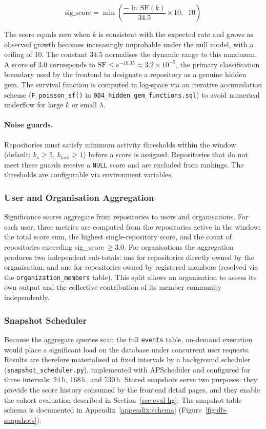 \documentclass[sigconf]{acmart}
\begin{document}
$$\text{sig\_score} = \min\!\left(\frac{-\ln\,\mathrm{SF}(k)}{34.5} \times 10,\;\; 10\right)$$

The score equals zero when $k$ is consistent with the expected rate and grows as
observed growth becomes increasingly improbable under the null model, with a
ceiling of 10. The constant $34.5$ normalises the dynamic range to this maximum.
A score of $3.0$ corresponds to
$\mathrm{SF} \leq e^{-10.35} \approx 3.2 \times 10^{-5}$, the primary
classification boundary used by the frontend to designate a repository as a
genuine hidden gem. The survival function is computed in log-space via an
iterative accumulation scheme (\texttt{F\_poisson\_sf()} in
\texttt{004\_hidden\_gem\_functions.sql}) to avoid numerical underflow for large
$k$ or small $\lambda$.

\paragraph{Noise guards.}
Repositories must satisfy minimum activity thresholds within the window (default:
$k_{\star} \geq 5$, $k_{\mathrm{fork}} \geq 1$) before a score is assigned. Repositories
that do not meet these guards receive a \texttt{NULL} score and are excluded from
rankings. The thresholds are configurable via environment variables.

\subsubsection{User and Organisation Aggregation}

Significance scores aggregate from repositories to users and organisations.
For each user, three metrics are computed from the repositories active in the
window: the total score sum, the highest single-repository score, and the count
of repositories exceeding sig\_score\,$\geq 3.0$. For organisations the
aggregation produces two independent sub-totals: one for repositories directly
owned by the organisation, and one for repositories owned by registered members
(resolved via the \texttt{organization\_members} table). This split allows an
organisation to assess its own output and the collective contribution of its
member community independently.

\subsubsection{Snapshot Scheduler}

Because the aggregate queries scan the full \texttt{events} table, on-demand
execution would place a significant load on the database under concurrent user
requests. Results are therefore materialised at fixed intervals by a background
scheduler (\texttt{snapshot\_scheduler.py}), implemented with APScheduler and
configured for three intervals: 24\,h, 168\,h, and 730\,h. Stored snapshots
serve two purposes: they provide the score history consumed by the frontend
detail pages, and they enable the cohort evaluation described in
Section~\ref{sec:eval-hg}. The snapshot table schema is documented in
Appendix~\ref{appendix:schema} (Figure~\ref{fig:db-snapshots}).
\end{document}
